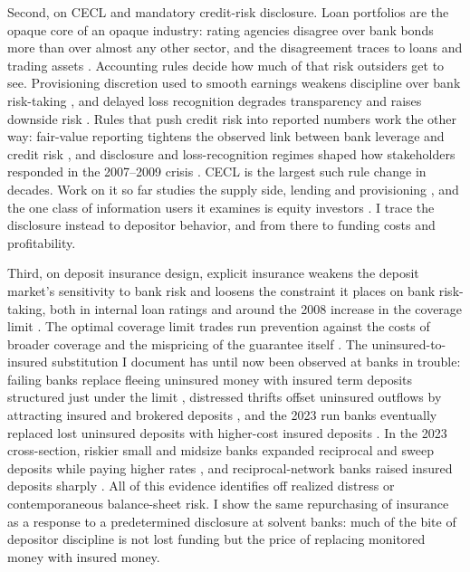 Second, on CECL and mandatory credit-risk disclosure.  Loan
portfolios are the opaque core of an opaque industry: rating agencies
disagree over bank bonds more than over almost any other sector, and
the disagreement traces to loans and trading assets
\citep{morgan2002rating}.  Accounting rules decide how much of that
risk outsiders get to see.  Provisioning discretion used to smooth
earnings weakens discipline over bank risk-taking
\citep{bushman2012accounting}, and delayed loss recognition degrades
transparency and raises downside risk \citep{bushman2015delayed}.
Rules that push credit risk into reported numbers work the other way:
fair-value reporting tightens the observed link between bank leverage
and credit risk \citep{blankespoor2013fair}, and disclosure and
loss-recognition regimes shaped how stakeholders responded in the
2007--2009 crisis \citep{bischof2021accounting}.  CECL is the largest
such rule change in decades.  Work on it so far studies the supply
side, lending \citep{granja2025current, chen2022does} and provisioning
\citep{kim2026current}, and the one class of information users it
examines is equity investors \citep{gee2022decision}.  I trace the
disclosure instead to depositor behavior, and from there to funding
costs and profitability.

Third, on deposit
insurance design, explicit insurance weakens the deposit market's
sensitivity to bank risk \citep{demirgucc2004market} and loosens the
constraint it places on bank risk-taking, both in internal loan ratings
\citep{ioannidou2010deposit} and around the 2008 increase in the
coverage limit \citep{lambert2017insured}.  The optimal
coverage limit trades run prevention against the costs of broader
coverage and the mispricing of the guarantee itself
\citep{davila2023optimal, pennacchi2006deposit}.  The uninsured-to-insured
substitution I document has until now been observed at banks in
trouble: failing banks replace fleeing uninsured money with insured
term deposits structured just under the limit \citep{martin2026deposit},
distressed thrifts offset uninsured outflows by attracting insured and
brokered deposits \citep{goldberg2002depositor}, and the 2023 run
banks eventually replaced lost uninsured deposits with higher-cost
insured deposits \citep{cipriani2024tracing}.  In the 2023
cross-section, riskier small and midsize banks expanded reciprocal and
sweep deposits while paying higher rates \citep{huberdeau2025adverse},
and reciprocal-network banks raised insured deposits sharply
\citep{kim2024insurance}.  All of this evidence identifies off
realized distress or contemporaneous balance-sheet risk.  I show the
same repurchasing of insurance as a response to a predetermined
disclosure at solvent banks: much of the bite of depositor discipline
is not lost funding but the price of replacing monitored money with
insured money.
